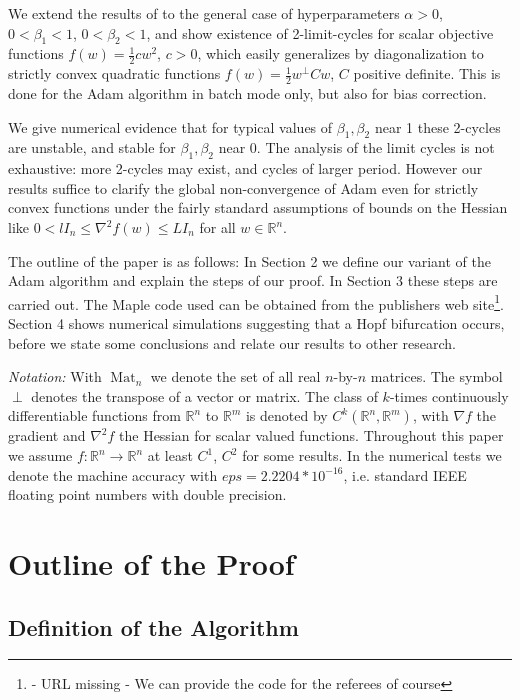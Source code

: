 \documentclass[runningheads]{llncs}
\def\transpose{\perp}
\def\weight{w}
\def\ball#1#2{B_{#1}(#2)}
\DeclareMathOperator{\Mat}{Mat}
\newcommand{\norm}[1]{\left\lVert#1\right\rVert}
\newcommand{\R}{\mathbb{R}} %
\begin{document}
We extend the results of \cite{daSilva.2018} to the general case of
hyperparameters $\alpha>0$, $0<\beta_1< 1$, $0<\beta_2< 1$, and show existence
of 2-limit-cycles for scalar objective functions $f(\weight)=\frac 1 2 c\weight^2$, 
$c>0$, which easily generalizes by diagonalization to strictly convex quadratic functions 
$f(\weight)=\frac 1 2 \weight^\transpose C \weight$, $C$ positive definite.
This is done for the Adam algorithm in batch mode only, but also for bias correction.

We give numerical evidence that for typical values of $\beta_1, \beta_2$ near 1
these 2-cycles are unstable, and stable for $\beta_1, \beta_2$ near 0.
The analysis of the limit cycles is not exhaustive: more 2-cycles may exist, 
and cycles of larger period. However our results suffice to clarify the global 
non-convergence of Adam even for strictly convex functions under the fairly 
standard assumptions of bounds on the Hessian like 
$0 < l I_n \leq \nabla^2 f(\weight) \leq LI_n$ for all $\weight\in \R^n$.

The outline of the paper is as follows: In Section 2 we define our variant of
the Adam algorithm and explain the steps of our proof. In Section 3 these steps
are carried out. The Maple code used can be obtained from the publishers web site\footnote{- URL missing - We can provide the code for the referees of course}.
Section 4 shows numerical simulations suggesting that a Hopf
bifurcation occurs, before we state some conclusions and relate our results to
other research. 

{\em Notation:}
With $\Mat_n$ we denote the set of all real $n$-by-$n$ matrices. 
The symbol $\transpose$ denotes the transpose of a vector or matrix. 
The class of $k$-times continuously differentiable functions from $\R^n$ to $\R^m$ is denoted by $C^k(\R^n,\R^m)$, with $\nabla f$ the gradient and $\nabla^2 f$ the Hessian
for scalar valued functions. 
Throughout this paper we assume $f:\R^n\to\R^n$ at least $C^1$, $C^2$ for some results. 
In the numerical tests we denote the machine accuracy with $eps = 2.2204*10^{-16}$, i.e. standard IEEE floating point numbers with double 
precision.

\section{Outline of the Proof}
\subsection{Definition of the Algorithm}
\end{document}
